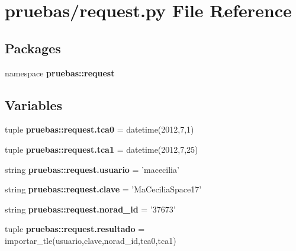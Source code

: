 \section{pruebas/request.py \-File \-Reference}
\label{request_8py}
\subsection*{\-Packages}
\begin{DoxyCompactItemize}
\item 
namespace {\bf pruebas\-::request}
\end{DoxyCompactItemize}
\subsection*{\-Variables}
\begin{DoxyCompactItemize}
\item 
tuple {\bf pruebas\-::request.\-tca0} = datetime(2012,7,1)
\item 
tuple {\bf pruebas\-::request.\-tca1} = datetime(2012,7,25)
\item 
string {\bf pruebas\-::request.\-usuario} = 'macecilia'
\item 
string {\bf pruebas\-::request.\-clave} = '\-Ma\-Cecilia\-Space17'
\item 
string {\bf pruebas\-::request.\-norad\-\_\-id} = '37673'
\item 
tuple {\bf pruebas\-::request.\-resultado} = importar\-\_\-tle(usuario,clave,norad\-\_\-id,tca0,tca1)
\end{DoxyCompactItemize}
